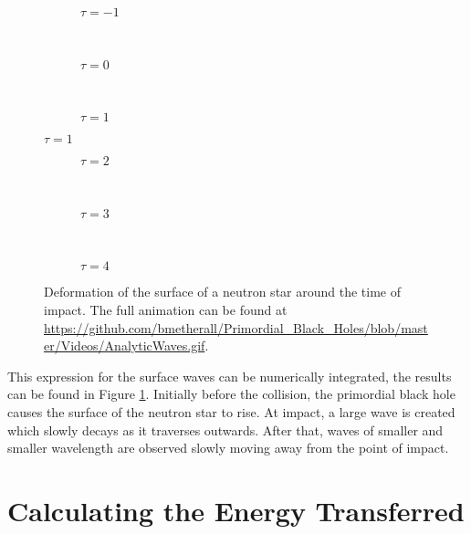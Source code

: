 \begin{figure}[p]
\begin{centering}
 \begin{subfigure}{\textwidth}
  
  \caption{$\tau = -1$}
 \end{subfigure} \\
 \begin{subfigure}{\textwidth}
  
  \caption{$\tau = 0$}
 \end{subfigure} \\
 \begin{subfigure}{\textwidth}
  
  \caption{$\tau = 1$}
 \end{subfigure}
\end{centering}
\end{figure}

\begin{figure}[p] \ContinuedFloat
\begin{centering}
 \begin{subfigure}{\textwidth}
  
  \caption{$\tau = 2$}
 \end{subfigure} \\
 \begin{subfigure}{\textwidth}
  
  \caption{$\tau = 3$}
 \end{subfigure} \\
  \begin{subfigure}{\textwidth}
  
  \caption{$\tau = 4$}
 \end{subfigure}
 \end{centering}
 \caption[Analytic Deformation of the Neutron Star]{Deformation of the surface of a neutron star around the time of impact. The full animation can be found at \url{https://github.com/bmetherall/Primordial_Black_Holes/blob/master/Videos/AnalyticWaves.gif}.}
 \label{fig:eta}
\end{figure}

This expression for the surface waves can be numerically integrated, the results can be found in Figure \ref{fig:eta}. Initially before the collision, the primordial black hole causes the surface of the neutron star to rise. At impact, a large wave is created which slowly decays as it traverses outwards. After that, waves of smaller and smaller wavelength are observed slowly moving away from the point of impact.

\section{Calculating the Energy Transferred}
\label{chap:energy}

